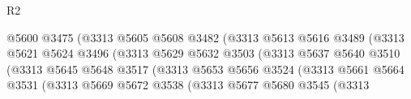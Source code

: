 \begin{lexlean}{R2}
\begin{coremodule}
                                            @5600
                                            @3475
                                            (@3313
                                              @5605
                                              @5608
                                              @3482
                                              (@3313
                                                @5613
                                                @5616
                                                @3489
                                                (@3313
                                                  @5621
                                                  @5624
                                                  @3496
                                                  (@3313
                                                    @5629
                                                    @5632
                                                    @3503
                                                    (@3313
                                                      @5637
                                                      @5640
                                                      @3510
                                                      (@3313
                                                        @5645
                                                        @5648
                                                        @3517
                                                        (@3313
                                                          @5653
                                                          @5656
                                                          @3524
                                                          (@3313
                                                            @5661
                                                            @5664
                                                            @3531
                                                            (@3313
                                                              @5669
                                                              @5672
                                                              @3538
                                                              (@3313
                                                                @5677
                                                                @5680
                                                                @3545
                                                                (@3313

\end{coremodule}
\end{lexlean}

